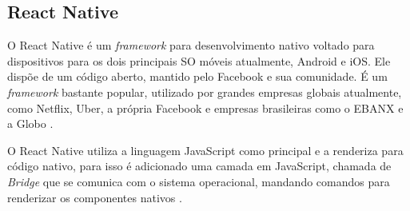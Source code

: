 \subsection{React Native}
\label{fund:react-native}
O React Native é um \textit{framework} para desenvolvimento nativo voltado para dispositivos para os dois principais SO móveis atualmente, Android e iOS. Ele dispõe de um código aberto, mantido pelo Facebook e sua comunidade. É um \textit{framework} bastante popular, utilizado por grandes empresas globais atualmente, como Netflix, Uber, a própria Facebook e empresas brasileiras como o EBANX e a Globo \cite{empresasbrreact}.

O React Native utiliza a linguagem JavaScript como principal e a renderiza para código nativo, para isso é adicionado uma camada em JavaScript, chamada de \textit{Bridge} que se comunica com o sistema operacional, mandando comandos para renderizar os componentes nativos \cite{docreactnative}.

